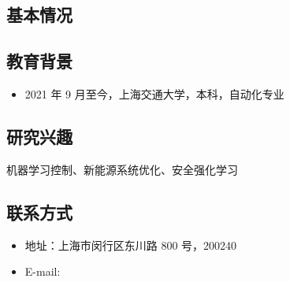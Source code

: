 
\begin{resume}
  \subsection*{基本情况}

  \subsection*{教育背景}
  \begin{itemize}
    \item 2021 年 9 月至今，上海交通大学，本科，自动化专业
  \end{itemize}

  \subsection*{研究兴趣}
    机器学习控制、新能源系统优化、安全强化学习

  \subsection*{联系方式}
  \begin{itemize}
    \item 地址：上海市闵行区东川路 800 号，200240
    \item E-mail: %
  \end{itemize}
\end{resume}
